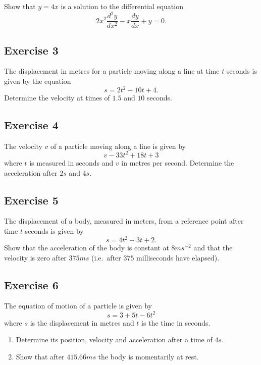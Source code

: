 \documentclass[
  11pt,
  oneside]{book}
\providecommand{\tightlist}{%
  \setlength{\itemsep}{0pt}\setlength{\parskip}{0pt}}
\newcommand{\slide}{}
\theoremstyle{definition}
\theoremstyle{definition}
\theoremstyle{definition}
\theoremstyle{definition}
\theoremstyle{remark}
\begin{document}
Show that \(y=4x\) is a solution to the differential equation
\[
2x^2\frac{d^2y}{dx^2}-x\frac{dy}{dx}+y=0.
\]

\slide

\subsection*{Exercise 3}\label{exercise-3-1}

The displacement in metres for a particle moving along a line at time \(t\) seconds is given by the equation
\[
s=2t^2-10t+4.
\]
Determine the velocity at times of \(1.5\) and \(10\) seconds.

\slide

\subsection*{Exercise 4}\label{exercise-4-1}

The velocity \(v\) of a particle moving along a line is given by
\[
v-33t^2+18t+3
\]
where \(t\) is measured in seconds and \(v\) in metres per second. Determine the acceleration after \(2s\) and \(4s\).
\slide

\subsection*{Exercise 5}\label{exercise-5}

The displacement of a body, measured in meters, from a reference point after time \(t\) seconds is given by
\[
s=4t^2-3t+2.
\]
Show that the acceleration of the body is constant at \(8ms^{-2}\) and that the velocity is zero after \(375ms\) (i.e.~after \(375\) milliseconds have elapsed).
\slide

\subsection*{Exercise 6}\label{exercise-6}

The equation of motion of a particle is given by
\[
s=3+5t-6t^2
\]
where \(s\) is the displacement in metres and \(t\) is the time in seconds.

\begin{enumerate}
\def\labelenumi{\alph{enumi}.}
\tightlist
\item
  Determine its position, velocity and acceleration after a time of \(4s\).
\item
  Show that after \(415.6\overline{6}ms\) the body is momentarily at rest.
\end{enumerate}
\end{document}
